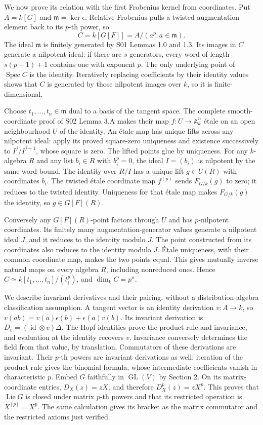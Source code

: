 \documentclass[11pt,a4paper,openany]{report}
\begin{document}
We now prove its relation with the first Frobenius kernel from coordinates. Put \(A=k[G]\) and \(\mathfrak m=\ker\epsilon\). Relative Frobenius pulls a twisted augmentation element back to its \(p\)-th power, so \[
 C=k[G[F]]=A/(a^p:a\in\mathfrak m).
\] The ideal \(\mathfrak m\) is finitely generated by S01 Lemmas 1.0 and 1.3. Its images in \(C\) generate a nilpotent ideal: if there are \(s\) generators, every word of length \(s(p-1)+1\) contains one with exponent \(p\). The only underlying point of \(\operatorname{Spec}C\) is the identity. Iteratively replacing coefficients by their identity values shows that \(C\) is generated by those nilpotent images over \(k\), so it is finite-dimensional.

Choose \(t_1,\ldots,t_n\in\mathfrak m\) dual to a basis of the tangent space. The complete smooth-coordinate proof of S02 Lemma 3.A makes their map \(f:U\to\mathbb A^n_k\) étale on an open neighbourhood \(U\) of the identity. An étale map has unique lifts across any nilpotent ideal: apply its proved square-zero uniqueness and existence successively to \(I^j/I^{j+1}\), whose square is zero. The lifted points glue by uniqueness. For any \(k\)-algebra \(R\) and any list \(b_i\in R\) with \(b_i^p=0\), the ideal \(I=(b_i)\) is nilpotent by the same word bound. The identity over \(R/I\) has a unique lift \(g\in U(R)\) with coordinates \(b_i\). The twisted étale coordinate map \(f^{(p)}\) sends \(F_{G/k}(g)\) to zero; it reduces to the twisted identity. Uniqueness for that étale map makes \(F_{G/k}(g)\) the identity, so \(g\in G[F](R)\).

Conversely any \(G[F](R)\)-point factors through \(U\) and has \(p\)-nilpotent coordinates. Its finitely many augmentation-generator values generate a nilpotent ideal \(J\), and it reduces to the identity modulo \(J\). The point constructed from its coordinates also reduces to the identity modulo \(J\). Étale uniqueness, with their common coordinate map, makes the two points equal. This gives mutually inverse natural maps on every algebra \(R\), including nonreduced ones. Hence \(C\simeq k[t_1,\ldots,t_n]/(t_i^p)\), and \(\dim_k C=p^n\).

We describe invariant derivatives and their pairing, without a distribution-algebra classification assumption. A tangent vector is an identity derivation \(v:A\to k\), so \(v(ab)=v(a)\epsilon(b)+\epsilon(a)v(b)\). Its invariant derivation is \(D_v=(\operatorname{id}\otimes v)\Delta\). The Hopf identities prove the product rule and invariance, and evaluation at the identity recovers \(v\). Invariance conversely determines the field from that value, by translation. Commutators of these derivations are invariant. Their \(p\)-th powers are invariant derivations as well: iteration of the product rule gives the binomial formula, whose intermediate coefficients vanish in characteristic \(p\). Embed \(G\) faithfully in \(\operatorname{GL}(V)\) by Section 2. On its matrix-coordinate entries, \(D_X(z)=zX\), and therefore \(D_X^p(z)=zX^p\). This proves that \(\operatorname{Lie}G\) is closed under matrix \(p\)-th powers and that its restricted operation is \(X^{[p]}=X^p\). The same calculation gives its bracket as the matrix commutator and the restricted axioms just verified.
\end{document}
